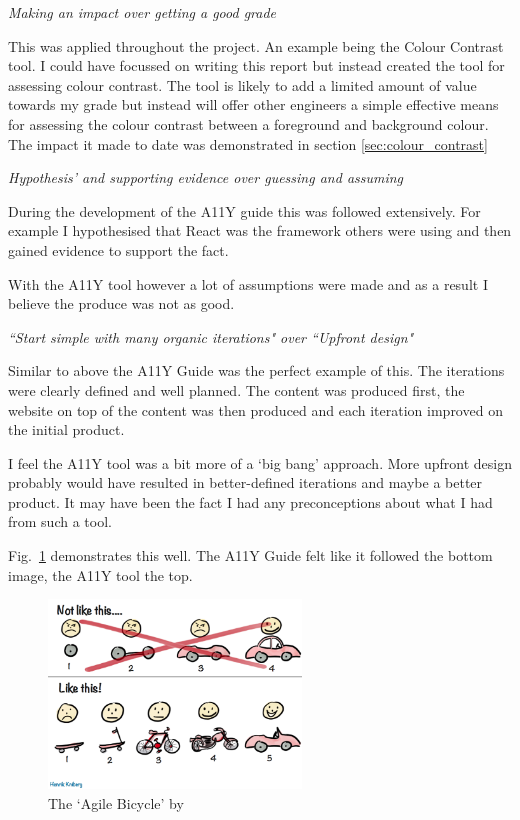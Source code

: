 \begin{center}
\textit{Making an impact over getting a good grade}
\end{center}
This was applied throughout the project. An example being the Colour Contrast
tool. I could have focussed on writing this report but instead created the
tool for assessing colour contrast. The tool is likely to add a limited amount
of value towards my grade but instead will offer other engineers a simple
effective means for assessing the colour contrast between a foreground and
background colour. The impact it made to date was demonstrated in
section \ref{sec:colour_contrast}

\begin{center}
\textit{Hypothesis’ and supporting evidence over guessing and assuming}
\end{center}
During the development of the A11Y guide this was followed extensively. For
example I hypothesised that React was the framework others were using and
then gained evidence to support the fact.

With the A11Y tool however a lot of assumptions were made and as a result I
believe the produce was not as good.

\begin{center}
\textit{``Start simple with many organic iterations" over ``Upfront design"}
\end{center}
Similar to above the A11Y Guide was the perfect example of this. The
iterations were clearly defined and well planned. The content was produced
first, the website on top of the content was then produced and each
iteration improved on the initial product.

I feel the A11Y tool was a bit more of a `big bang' approach. More upfront
design probably would have resulted in better-defined iterations and maybe a
better product. It may have been the fact I had any preconceptions about what
I had from such a tool.

Fig.~\ref{fig:agile_bicycle} demonstrates this well. The A11Y Guide felt like
it followed the bottom image, the A11Y tool the top.

\begin{figure}[H]
\centering
\includegraphics[width=0.6\textwidth]{figures/agile_bicycle}
\captionsetup{justification=centering}
\caption{The `Agile Bicycle' by \citep{bicycle}
\label{fig:agile_bicycle}}
\end{figure}

